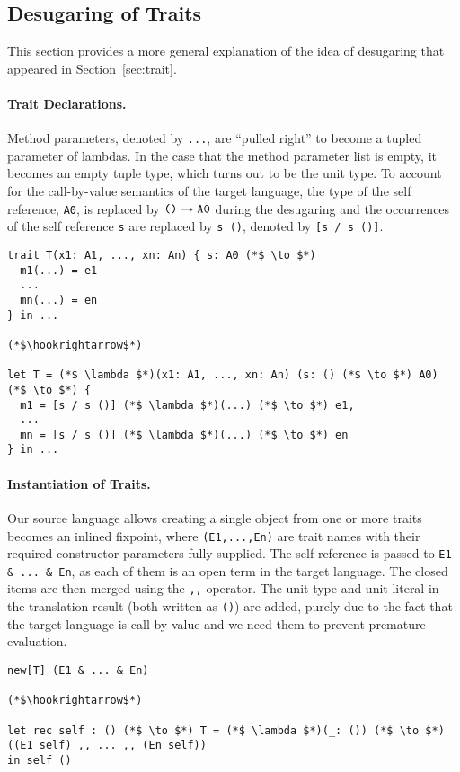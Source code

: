 \subsection{Desugaring of Traits}

This section provides a more general explanation of the idea of desugaring that
appeared in Section~\ref{sec:trait}.

\paragraph{Trait Declarations.} Method parameters, denoted by \lstinline$...$,
are ``pulled right'' to become a tupled parameter of lambdas. In the case that
the method parameter list is empty, it becomes an empty tuple type, which turns
out to be the unit type. To account for the call-by-value semantics of the
target language, the type of the self reference, \lstinline$A0$, is replaced by
$\texttt{()} \to \texttt{A0}$ during the desugaring and the occurrences of the self
reference \lstinline$s$ are replaced by \lstinline$s ()$, denoted by
\lstinline$[s / s ()]$.

\begin{lstlisting}
trait T(x1: A1, ..., xn: An) { s: A0 (*$ \to $*)
  m1(...) = e1
  ...
  mn(...) = en
} in ...

(*$\hookrightarrow$*)

let T = (*$ \lambda $*)(x1: A1, ..., xn: An) (s: () (*$ \to $*) A0) (*$ \to $*) {
  m1 = [s / s ()] (*$ \lambda $*)(...) (*$ \to $*) e1,
  ...
  mn = [s / s ()] (*$ \lambda $*)(...) (*$ \to $*) en
} in ...
\end{lstlisting}

\paragraph{Instantiation of Traits.} Our source language allows creating a
single object from one or more traits becomes an
inlined fixpoint, where \lstinline$(E1,...,En)$ are trait names with their
required constructor parameters fully supplied. The self reference is passed to
\lstinline$E1 & ... & En$, as each of them is an open term in the target
language. The closed items are then merged using the \lstinline$,,$ operator.
The unit type and unit literal in the translation result (both written as
\lstinline$()$) are added, purely due to the fact that the target language is
call-by-value and we need them to prevent premature evaluation.

\begin{lstlisting}
new[T] (E1 & ... & En)

(*$\hookrightarrow$*)

let rec self : () (*$ \to $*) T = (*$ \lambda $*)(_: ()) (*$ \to $*) ((E1 self) ,, ... ,, (En self))
in self ()
\end{lstlisting}

